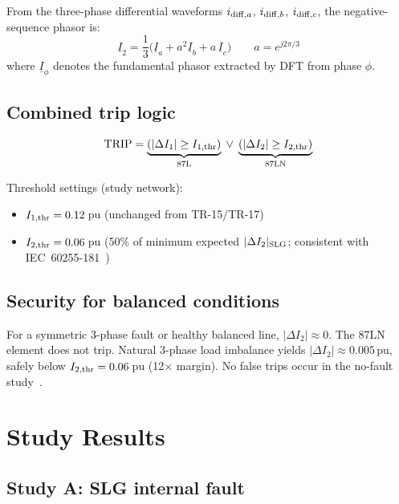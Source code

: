 \documentclass[11pt, a4paper]{article}
\begin{document}
From the three-phase differential waveforms $i_{{\rm diff},a}$,
$i_{{\rm diff},b}$, $i_{{\rm diff},c}$, the negative-sequence phasor is:
\begin{equation}
  \underline{I}_2 = \frac{1}{3}
    \bigl(\underline{I}_a + a^2\underline{I}_b + a\,\underline{I}_c\bigr)
  \qquad a = e^{j2\pi/3}
  \label{eq:I2_phasor}
\end{equation}
where $\underline{I}_\phi$ denotes the fundamental phasor extracted by DFT
from phase $\phi$.

\subsection{Combined trip logic}

\begin{equation}
  \text{TRIP} = \underbrace{(|\Delta I_1| \geq I_{1,\rm thr})}_{\text{87L}}
              \;\vee\;
              \underbrace{(|\Delta I_2| \geq I_{2,\rm thr})}_{\text{87LN}}
  \label{eq:trip}
\end{equation}

Threshold settings (study network):
\begin{itemize}
  \item $I_{1,\rm thr} = 0.12$\,pu (unchanged from TR-15/TR-17)
  \item $I_{2,\rm thr} = 0.06$\,pu (50\% of minimum expected
        $|\Delta I_2|_{\rm SLG}$; consistent with
        IEC~60255-181~\cite{IEC_60255_181})
\end{itemize}

\subsection{Security for balanced conditions}

For a symmetric 3-phase fault or healthy balanced line, $|\Delta I_2| \approx 0$.
The 87LN element does not trip.  Natural 3-phase load imbalance yields
$|\Delta I_2| \approx 0.005$\,pu, safely below $I_{2,\rm thr} = 0.06$\,pu
(12$\times$ margin).  No false trips occur in the no-fault study~\cite{IEEE_C37_243}.


\section{Study Results}
\label{sec:results}

\subsection{Study A: SLG internal fault}
\end{document}
